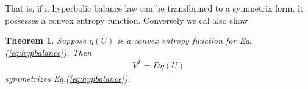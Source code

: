 \documentclass[11pt, reqno]{amsart}
\newcommand{\eqr}[1]{Eq.\thinspace(#1)}
\newtheorem{thm}{Theorem}
\theoremstyle{definition}
\begin{document}
That is, if a hyperbolic balance law can be transformed to a symmetrix
form, it possesses a convex entropy function. Conversely we cal also
show
\begin{thm}
  Suppose $\eta(U)$ is a convex entropy function for
  \eqr{\ref{eq:hypbalance}}. Then
  \begin{align}
    V^T = D\eta(U)
  \end{align}
  symmetrizes \eqr{\ref{eq:hypbalance}}.
\end{thm} 
\end{document}
